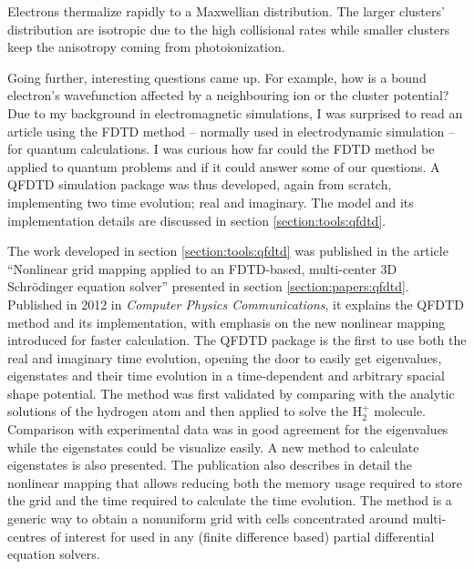 Electrons thermalize rapidly to a Maxwellian distribution. The larger clusters'
distribution are isotropic due to the high collisional rates while smaller
clusters keep the anisotropy coming from photoionization.




Going further, interesting questions came up. For example, how is a bound
electron's wavefunction affected by a neighbouring ion or the cluster potential?
Due to my background in electromagnetic simulations, I was surprised to read
an article using the FDTD method -- normally used in electrodynamic simulation --
for quantum calculations. I was curious how far could the FDTD method be
applied to quantum problems and if it could answer some of our questions.
A QFDTD simulation package was thus developed, again from scratch,  implementing
two time evolution; real and imaginary. The model and its implementation details
are discussed in section \ref{section:tools:qfdtd}.

The work developed in section \ref{section:tools:qfdtd} was published in the article
``Nonlinear grid mapping applied to an FDTD-based, multi-center 3D
Schr\"odinger equation solver'' presented in section \ref{section:papers:qfdtd}.
Published in 2012 in \textit{Computer Physics Communications}, it
explains the QFDTD method and its implementation, with emphasis on the new
nonlinear mapping introduced for faster calculation. The QFDTD package is the
first to use both the real and imaginary time evolution, opening the door to
easily get eigenvalues, eigenstates and their time evolution in a time-dependent
and arbitrary spacial shape potential.
The method was first validated by comparing with the analytic solutions of
the hydrogen atom and then applied to solve the H$_{2}^{+}$ molecule.
Comparison with experimental data was in good agreement for the eigenvalues
while the eigenstates could be visualize easily. A new method to calculate
eigenstates is also presented. The publication also
describes in detail the nonlinear mapping that allows reducing both the memory
usage required to store the grid and the time required to calculate the time
evolution. The method is a generic way to obtain a nonuniform grid with cells
concentrated around multi-centres of interest for used in any (finite difference
based) partial differential equation solvers.


